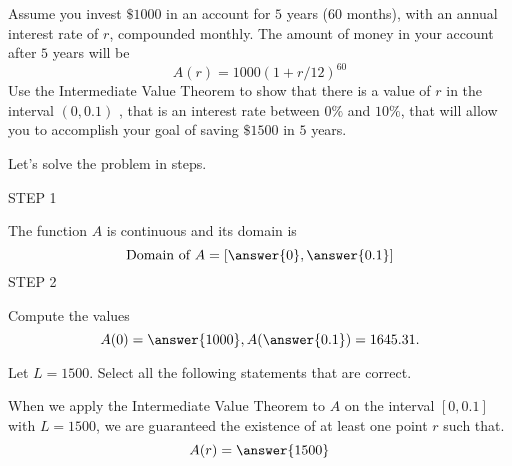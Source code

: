 \documentclass{ximera}
\author{Nela Lakos }
\begin{document}
\begin{exercise}
Assume you invest   $\$1000$ in an account for $5$ years ($60$ months), with an annual interest rate of $r$, compounded monthly.
The amount of money in your account after $5$ years will be
\[
A(r)=1000(1+r/12)^{60}
\]
Use the Intermediate Value Theorem to show that there is a value of $r$ in the interval $(0,0.1)$ , that is an interest rate between $0\%$ and $10\%$,
that will allow you to accomplish your goal of saving $\$1500$ in $5$ years.

Let's solve the problem in steps.

STEP 1

The function $A$ is continuous and its domain is
\[
\text{Domain of }A=[\answer{0},\answer{0.1}]
\] 
STEP 2

\begin{exercise}

Compute the values
\[
A(0)=\answer{1000},
A(\answer{0.1})=1645.31.
\]

\end{exercise}

\begin{exercise}
 Let $L=1500$. Select all the following statements that are correct.

\begin{selectAll}
\end{selectAll}

\end{exercise}
When we apply the Intermediate Value Theorem to $A$ on the interval $\left[0,0.1\right]$ with $L=1500$, we are guaranteed the existence of at least one point $r$ such that.
\[
A(r)=\answer{1500}
\]
\end{exercise}
\end{document}
